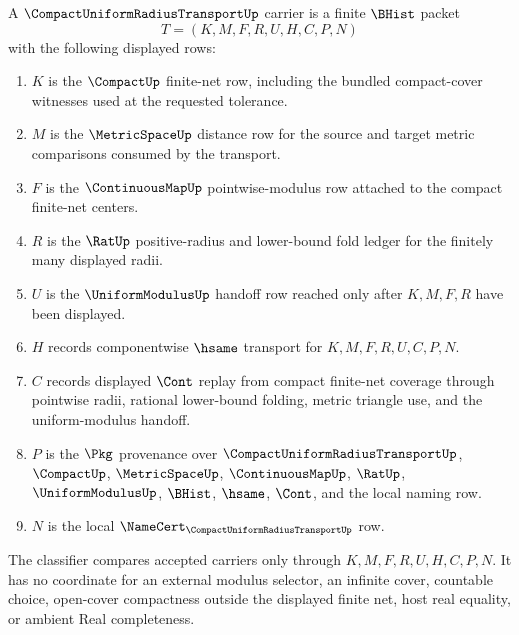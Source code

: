 \begin{definition}
\label{def:compact-uniform-radius-transport-carrier}
A $\CompactUniformRadiusTransportUp$ carrier is a finite $\BHist$ packet
$$
T=(K,M,F,R,U,H,C,P,N)
$$
with the following displayed rows:
\begin{enumerate}
\item $K$ is the $\CompactUp$ finite-net row, including the bundled compact-cover witnesses used at the requested tolerance.
\item $M$ is the $\MetricSpaceUp$ distance row for the source and target metric comparisons consumed by the transport.
\item $F$ is the $\ContinuousMapUp$ pointwise-modulus row attached to the compact finite-net centers.
\item $R$ is the $\RatUp$ positive-radius and lower-bound fold ledger for the finitely many displayed radii.
\item $U$ is the $\UniformModulusUp$ handoff row reached only after $K,M,F,R$ have been displayed.
\item $H$ records componentwise $\hsame$ transport for $K,M,F,R,U,C,P,N$.
\item $C$ records displayed $\Cont$ replay from compact finite-net coverage through pointwise radii, rational lower-bound folding, metric triangle use, and the uniform-modulus handoff.
\item $P$ is the $\Pkg$ provenance over $\CompactUniformRadiusTransportUp$, $\CompactUp$, $\MetricSpaceUp$, $\ContinuousMapUp$, $\RatUp$, $\UniformModulusUp$, $\BHist$, $\hsame$, $\Cont$, and the local naming row.
\item $N$ is the local $\NameCert_{\CompactUniformRadiusTransportUp}$ row.
\end{enumerate}
The classifier compares accepted carriers only through $K,M,F,R,U,H,C,P,N$. It has no coordinate for an external modulus selector, an infinite cover, countable choice, open-cover compactness outside the displayed finite net, host real equality, or ambient Real completeness.
\end{definition}

